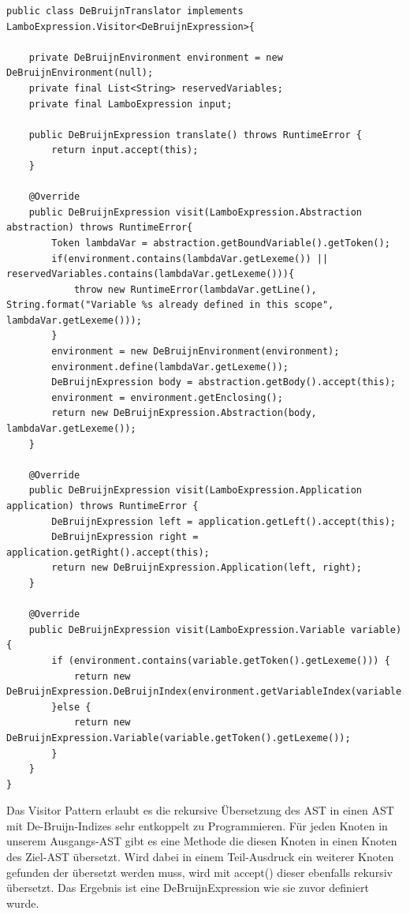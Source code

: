 \documentclass[ngerman]{article}
\begin{document}
\begin{lstlisting}[caption={TODO: Referenz zu Anhang}, captionpos=b]
public class DeBruijnTranslator implements LamboExpression.Visitor<DeBruijnExpression>{

    private DeBruijnEnvironment environment = new DeBruijnEnvironment(null);
    private final List<String> reservedVariables;
    private final LamboExpression input;

    public DeBruijnExpression translate() throws RuntimeError {
        return input.accept(this);
    }

    @Override
    public DeBruijnExpression visit(LamboExpression.Abstraction abstraction) throws RuntimeError{
        Token lambdaVar = abstraction.getBoundVariable().getToken();
        if(environment.contains(lambdaVar.getLexeme()) || reservedVariables.contains(lambdaVar.getLexeme())){
            throw new RuntimeError(lambdaVar.getLine(), String.format("Variable %s already defined in this scope", lambdaVar.getLexeme()));
        }
        environment = new DeBruijnEnvironment(environment);
        environment.define(lambdaVar.getLexeme());
        DeBruijnExpression body = abstraction.getBody().accept(this);
        environment = environment.getEnclosing();
        return new DeBruijnExpression.Abstraction(body, lambdaVar.getLexeme());
    }

    @Override
    public DeBruijnExpression visit(LamboExpression.Application application) throws RuntimeError {
        DeBruijnExpression left = application.getLeft().accept(this);
        DeBruijnExpression right = application.getRight().accept(this);
        return new DeBruijnExpression.Application(left, right);
    }

    @Override
    public DeBruijnExpression visit(LamboExpression.Variable variable) {
        if (environment.contains(variable.getToken().getLexeme())) {
            return new DeBruijnExpression.DeBruijnIndex(environment.getVariableIndex(variable.getToken().getLexeme()));
        }else {
            return new DeBruijnExpression.Variable(variable.getToken().getLexeme());
        }
    }
}
\end{lstlisting}
Das Visitor Pattern erlaubt es die rekursive Übersetzung des AST in einen AST mit De-Bruijn-Indizes sehr entkoppelt zu Programmieren. Für jeden Knoten in unserem Ausgangs-AST gibt es eine Methode die diesen Knoten in einen Knoten des Ziel-AST übersetzt. Wird dabei in einem Teil-Ausdruck ein weiterer Knoten gefunden der übersetzt werden muss, wird mit accept() dieser ebenfalls rekursiv übersetzt. Das Ergebnis ist eine DeBruijnExpression wie sie zuvor definiert wurde.
\end{document}

